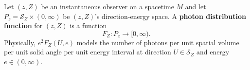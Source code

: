 Let $(z, Z)$ be an instantaneous observer on a spacetime $M$ and let $P_z = \mathcal{S}_Z \times (0,\infty)$ be $(z, Z)$'s direction-energy space. A \textbf{photon distribution function} for $(z, Z)$ is a function
$$
F_Z: P_z \to [0, \infty).
$$
Physically, $e^2 F_Z(U, e)$ models the number of photons per unit spatial volume per unit solid angle per unit energy interval at direction $U \in \mathcal{S}_Z$ and energy $e \in (0,\infty)$.
